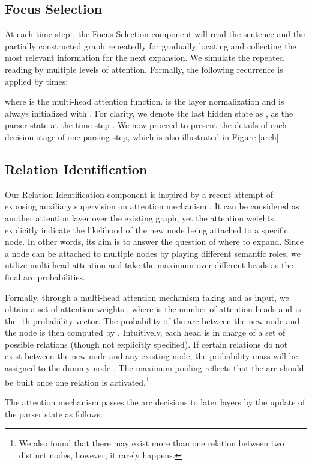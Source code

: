 \documentclass[11pt,a4paper]{article}
\begin{document}
	\subsection{Focus Selection}
	\label{rr}
	At each time step , the Focus Selection component will read the sentence and the partially constructed graph repeatedly for gradually locating and collecting the most relevant information for the next expansion. We simulate the repeated reading by multiple levels of attention. Formally, the following recurrence is applied by  times:
	
	where  is the multi-head attention function.  is the layer normalization \cite{lei2016layer} and  is always initialized with . For clarity, we denote the last hidden state  as , as the parser state at the time step . We now proceed to present the details of each decision stage of one parsing step, which is also illustrated in Figure \ref{arch}.
	\subsection{Relation Identification}
	\label{ri}
	Our Relation Identification component is inspired by a recent attempt of exposing auxiliary supervision on attention mechanism \cite{strubell-etal-2018-linguistically}. It can be considered as another attention layer over the existing graph, yet the attention weights explicitly indicate the likelihood of the new node being attached to a specific node. In other words, its aim is to answer the question of where to expand. Since a node can be attached to multiple nodes by playing different semantic roles, we utilize multi-head attention and take the maximum over different heads as the final arc probabilities.
	
	Formally, through a multi-head attention mechanism taking  and  as input, we obtain a set of attention weights , where  is the number of attention heads and  is the -th probability vector. The probability of the arc between the new node and the node  is then computed by  . Intuitively, each head is in charge of a set of possible relations (though not explicitly specified). If certain relations do not exist between the new node and any existing node, the probability mass will be assigned to the dummy node . The maximum pooling reflects that the arc should be built once one relation is activated.\footnote{We also found that there may exist more than one relation between two distinct nodes, however, it rarely happens.}
	
	The attention mechanism passes the arc decisions to later layers by the update of the parser state as follows:
	
\end{document}
